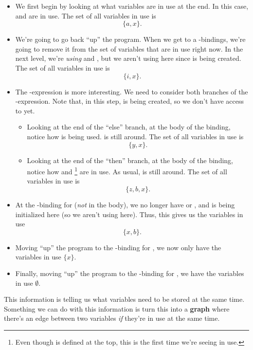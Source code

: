 \begin{itemize}
    \item We first begin by looking at what variables are in use at the end. In this case,  and  are in use. The set of all variables in use is \[\{a, x\}.\]
    \item We're going to go back ``up'' the program. When we get to a -bindings, we're going to remove it from the set of variables that are in use right now. In the next level, we're \emph{using}  and , but we aren't using  here since  is being created. The set of all variables in use is \[\{i, x\}.\]
    \item The -expression is more interesting. We need to consider both branches of the -expression. Note that, in this step,  is being created, so we don't have access to  yet.
    \begin{itemize}
        \item Looking at the end of the ``else'' branch, at the body of the  binding, notice how  is being used.  is still around. The set of all variables in use is \[\{y, x\}.\]
        \item Looking at the end of the ``then'' branch, at the body of the  binding, notice how  and \footnote{Even though  is defined at the top, this is the first time we're seeing  in use.} are in use. As usual,  is still around. The set of all variables in use is \[\{z, b, x\}.\]

    \end{itemize}
    \item At the -binding for  (\emph{not} in the body), we no longer have  or , and  is being initialized here (so we aren't using  here). Thus, this gives us the variables in use \[\{x, b\}.\] 
    \item Moving ``up'' the program to the -binding for , we now only have the variables in use $\{x\}$. 
    \item Finally, moving ``up'' the program to the -binding for , we have the variables in use $\emptyset$. 
\end{itemize}
This information is telling us what variables need to be stored at the same time. Something we can do with this information is turn this into a \textbf{graph} where there's an edge between two variables \emph{if} they're in use at the same time. 
